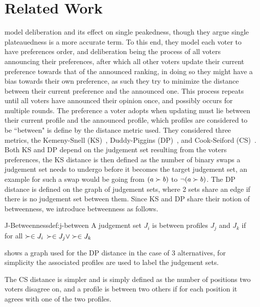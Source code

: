\section{Related Work}
\citet{radDeliberationSinglePeakednessCoherent2021a} model deliberation and its effect on single peakedness, though they argue single plateauedness is a more accurate term. To this end, they model each voter to have preferences order, and deliberation being the process of all voters announcing their preferences, after which all other voters update their current preference towards that of the announced ranking, in doing so they might have a bias towards their own preference, as such they try to minimize the distance between their current preference and the announced one. This process repeats until all voters have announced their opinion once, and possibly occurs for multiple rounds. The preference a voter adopts when updating must lie between their current profile and the announced profile, which profiles are considered to be ``between" is define by the distance metric used. They considered three metrics, the Kemeny-Snell (KS)~\citep{kemeny1962preference}, Duddy-Piggins (DP)~\citep{duddyMeasureDistanceJudgment2012a}, and Cook-Seiford (CS)~\citep{cookPriorityRankingConsensus1978}. Both KS and DP depend on the judgement set resulting from the voters preferences, the KS distance is then defined as the number of binary swaps a judgement set needs to undergo before it becomes the target judgement set, an example for such a swap would be going from $(a \succ b)$ to $\neg (a \succ b)$. The DP distance is defined on the graph of judgement sets, where 2 sets share an edge if there is no judgement set between them. Since KS and DP share their notion of betweenness, we introduce betweenness as follows.

\begin{definition}{J-Betweenness}{def:j-between}
	A judgement set $J_i$ is between profiles $J_j$ and $J_k$ if for all $\succ \in J_i$ \quad $\succ \in J_j \vee \succ \in J_k$
\end{definition}

 shows a graph used for the DP distance in the case of 3 alternatives, for simplicity the associated profiles are used to label the judgement sets.



The CS distance is simpler and is simply defined as the number of positions two voters disagree on, and a profile is between two others if for each position it agrees with one of the two profiles.

